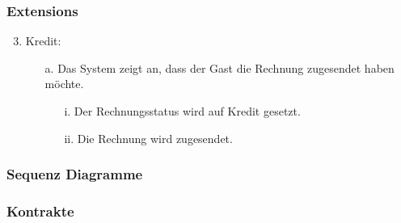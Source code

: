 \documentclass[./detailed_overview_usecases.tex]{subfiles}
\begin{document}
    \subsubsection*{Extensions}
    \begin{enumerate}
        \setcounter{enumi}{2}
        \item Kredit:
            \begin{itemize}
            \item[a.] Das System zeigt an, dass der Gast die Rechnung zugesendet haben möchte.
            \begin{itemize}
                \item[i.] Der Rechnungsstatus wird auf Kredit gesetzt.
                \item[ii.] Die Rechnung wird zugesendet.
            \end{itemize}
        \end{itemize}
    \end{enumerate}
    \subsubsection{Sequenz Diagramme}
    \subsubsection{Kontrakte}
\end{document}
